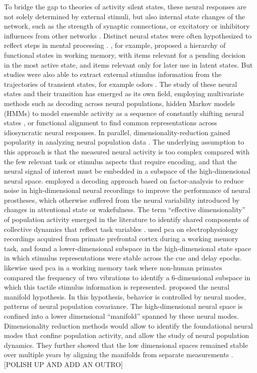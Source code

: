 To bridge the gap to theories of activity silent states, these neural responses are not solely determined by external stimuli, but also internal state changes of the network, such as the strength of synaptic connections, or excitatory or inhibitory influences from other networks \citep{buonomano2009state}.
Distinct neural states were often hypothesized to reflect steps in mental processing \citep[e.g.,][]{seidemann1996simultaneously}.
\citet{muhle2021hierarchy}, for example, proposed a hierarchy of functional states in working memory, with items relevant for a pending decision in the most active state, and items relevant only for later use in latent states.
But studies were also able to extract external stimulus information from the trajectories of transient states, for example odors \citep{mazor2005transient}.
The study of these neural states and their transition has emerged as its own field, employing multivariate methods such as decoding across neural populations, hidden Markov models (HMMs) to model ensemble activity as a sequence of constantly shifting neural states \citep{rainer2000neural}, or functional alignment \citep{haxby2011common} to find common representations across idiosyncratic neural responses.
In parallel, dimensionality-reduction gained popularity in analyzing neural population data \citep{cunningham2014dimensionality}.
The underlying assumption to this approach is that the measured neural activity is too complex compared with the few relevant task or stimulus aspects that require encoding, and that the neural signal of interest must be embedded in a subspace of the high-dimensional neural space.
\citet{santhanam2009factor} employed a decoding approach based on factor-analysis to reduce noise in high-dimensional neural recordings to improve the performance of neural prostheses, which otherwise suffered from the neural variability introduced by changes in attentional state or wakefulness.
The term ``effective dimensionality'' of population activity emerged in the literature to identify shared components of collective dynamics that reflect task variables \citep{jazayeri2021interpreting}.
\citet{murray2017stable} used \gls{pca} on electrophysiology recordings acquired from primate prefrontal cortex during a working memory task, and found a lower-dimensional subspace in the high-dimensional state space in which stimulus representations were stable across the cue and delay epochs.
\citet{machens2010functional} likewise used \gls{pca} in a working memory task where non-human primates compared the frequency of two vibrations to identify a 6-dimensional subspace in which this tactile stimulus information is represented.
\citet{gallego2017neural} proposed the neural manifold hypothesis.
In this hypothesis, behavior is controlled by neural modes, patterns of neural population covariance.
The high-dimensional neural space is confined into a lower dimensional ``manifold'' spanned by these neural modes.
Dimensionality reduction methods would allow to identify the foundational neural modes that confine population activity, and allow the study of neural population dynamics.
They further showed that the low dimensional spaces remained stable over multiple years by aligning the manifolds from separate measurements \citep{gallego2020long}.
[POLISH UP AND ADD AN OUTRO]

